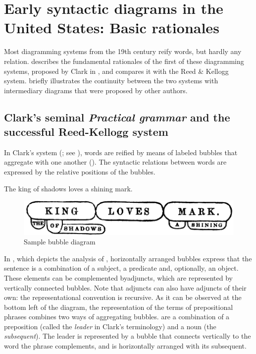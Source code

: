 \documentclass[english,output=paper,colorlinks,citecolor=brown]{../langscibook}
\begin{document}
\section{Early syntactic diagrams in the United States: Basic rationales}\label{sec:4:3}

Most diagramming systems from the 19th century reify words, but hardly any relation.  describes the fundamental rationales of the first of these diagramming systems, proposed by Clark in \citeyear{Clark1847}, and compares it with the Reed \& Kellogg system.  briefly illustrates the continuity between the two systems with intermediary diagrams that were proposed by other authors.

\subsection{Clark’s seminal \textit{Practical grammar} and the successful Reed-Kellogg system}\label{sec:4:3.1}

In Clark’s system (\citeyear{Clark1847}; see \citealt{Mazziotta2016}), words are reified by means of labeled bubbles that aggregate with one another (). The syntactic relations between words are expressed by the relative positions of the bubbles. 

\ea \label{ex:4:2} The king of shadows loves a shining mark.
\z
  
\begin{figure}
    \includegraphics[width=.75\textwidth]{figures/04/Clark.png}
    \caption{Sample bubble diagram \citep[23]{Clark1847}\label{fig:4:3}}
\end{figure}

In , which depicts the analysis of , horizontally arranged bubbles express that the sentence is a combination of a  subject, a predicate and, optionally, an object. These elements can be complemented byadjuncts, which are represented by vertically connected bubbles. Note that adjuncts can also have adjuncts of their own: the representational convention is recursive. As it can be observed at the bottom left of the diagram, the representation of the terms of prepositional phrases combines two ways of aggregating bubbles.  are a combination of a preposition (called the \textit{leader} in Clark’s terminology) and a noun (the \textit{subsequent}). The leader is represented by a bubble that connects vertically to the word the phrase complements, and is horizontally arranged with its subsequent.
\end{document}
